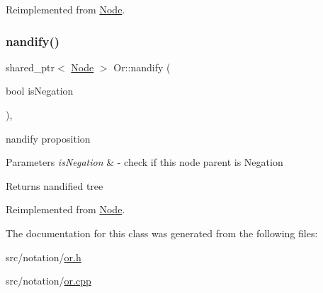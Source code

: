 Reimplemented from \hyperlink{class_node_afd0c2045f3955e02e3aa1e2e987f10b2}{Node}.

\mbox{\label{class_or_a1fc17643b67383ec7be340d278c8e60a}} 
\subsubsection{\texorpdfstring{nandify()}{nandify()}}
{\footnotesize\ttfamily shared\+\_\+ptr$<$ \hyperlink{class_node}{Node} $>$ Or\+::nandify (\begin{DoxyParamCaption}\item[{bool}]{is\+Negation }\end{DoxyParamCaption})\hspace{0.3cm}{\ttfamily [override]}, {\ttfamily [virtual]}}



nandify proposition 


\begin{DoxyParams}{Parameters}
{\em is\+Negation} & -\/ check if this node parent is Negation \\
\hline
\end{DoxyParams}
\begin{DoxyReturn}{Returns}
nandified tree 
\end{DoxyReturn}


Reimplemented from \hyperlink{class_node_a3b2e192b59b7e72908af7903c5a4e5c1}{Node}.



The documentation for this class was generated from the following files\+:\begin{DoxyCompactItemize}
\item 
src/notation/\hyperlink{or_8h}{or.\+h}\item 
src/notation/\hyperlink{or_8cpp}{or.\+cpp}\end{DoxyCompactItemize}

